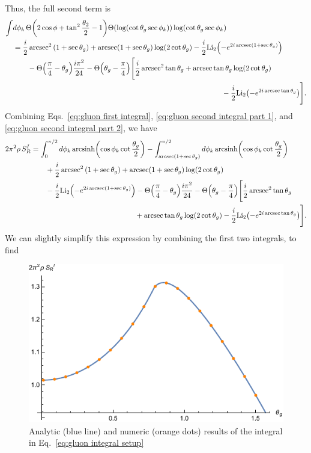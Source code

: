 \documentclass[11pt,twoside,reqno]{amsart}
\theoremstyle{plain}
\theoremstyle{remark}
\theoremstyle{definition}
\theoremstyle{remark}
\theoremstyle{definition}
\theoremstyle{definition}
\newcommand{\Li}{\mathrm{Li}}
\newcommand{\arcsinh}{\mathrm{arcsinh}}
\begin{document}
	Thus, the full second term is
	\begin{equation}\label{eq:gluon second integral part 2}
	\begin{aligned}
		\int &d\phi_k \,\Theta\qty(2\cos\phi + \tan^2\frac{\theta_2}{2} - 1)\Theta\qty(\log(\cot\theta_g \sec\phi_k))\log(\cot\theta_g \sec\phi_k) \\
		&= \frac{i}{2}\arcsec^2\qty(1 + \sec\theta_g) + \arcsec(1 + \sec\theta_g)\log(2\cot\theta_g) - \frac{i}{2}\Li_2\qty(-e^{2i\arcsec(1+\sec\theta_g)}) \\
			&\qquad - \Theta\qty(\frac{\pi}{4} - \theta_g)\frac{i\pi^2}{24} - \Theta\qty(\theta_g - \frac{\pi}{4})\Bigg[ \frac{i}{2}\arcsec^2\tan\theta_g + \arcsec\tan\theta_g \log(2\cot\theta_g) \\
			&\hspace{10cm} - \frac{i}{2}\Li_2\qty(-e^{2i\arcsec\tan\theta_g}) \Bigg].
	\end{aligned}
	\end{equation}
	Combining Eqs.~\ref{eq:gluon first integral}, \ref{eq:gluon second integral part 1}, and \ref{eq:gluon second integral part 2}, we have
	\begin{equation}
	\begin{aligned}
		2\pi^2\rho \, S_R^I &= \int_0^{\pi/2} d\phi_k \,\arcsinh\qty(\cos\phi_k\cot\frac{\theta_g}{2}) - \int_{\arcsec(1+\sec\theta_g)}^{\pi/2} d\phi_k \, \arcsinh\qty(\cos\phi_k \cot\frac{\theta_g}{2}) \\
			&\qquad + \frac{i}{2}\arcsec^2\qty(1 + \sec\theta_g) + \arcsec(1 + \sec\theta_g)\log(2\cot\theta_g) \\
			&\qquad - \frac{i}{2}\Li_2\qty(-e^{2i\arcsec(1+\sec\theta_g)}) - \Theta\qty(\frac{\pi}{4} - \theta_g)\frac{i\pi^2}{24} - \Theta\qty(\theta_g - \frac{\pi}{4})\Bigg[ \frac{i}{2}\arcsec^2\tan\theta_g \\
			&\hspace{5cm} + \arcsec\tan\theta_g \log(2\cot\theta_g) - \frac{i}{2}\Li_2\qty(-e^{2i\arcsec\tan\theta_g}) \Bigg].
	\end{aligned}
	\end{equation}
	We can slightly simplify this expression by combining the first two integrals, to find
	\begin{figure}
		\includegraphics[width=0.75\columnwidth]{figures/gluon_numerics.pdf}
		\caption{\label{fig:gluon result} Analytic (blue line) and numeric (orange dots) results of the integral in Eq.~\ref{eq:gluon integral setup}}
	\end{figure}
\end{document}

